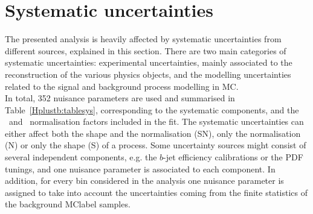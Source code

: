 \section{Systematic uncertainties}
The presented analysis is heavily affected by systematic uncertainties from different sources, explained in this section. There are two main categories of systematic uncertainties: experimental uncertainties, mainly associated to the reconstruction of the various physics objects, and the modelling uncertainties related to the signal and background process modelling in MC.\\

In total, 352 nuisance parameters are used and summarised in Table~\ref{Hplustb:tablesys}, corresponding to the systematic components, and the \ttb\ and \ttc\ normalisation factors included in the fit. The systematic uncertainties can either affect both the shape and the normalisation (SN), only the normalisation (N) or only the shape (S) of a process. Some uncertainty sources might consist of several independent components, e.g. the $b$-jet efficiency calibrations or the PDF tunings, and one nuisance parameter is associated to each component. In addition, for every bin considered in the analysis one nuisance parameter is assigned to take into account the uncertainties coming from the finite statistics of the background \acrshort{MClabel} samples.

